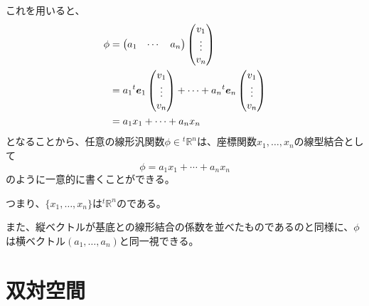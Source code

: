 \documentclass[../../../topic_linear-algebra]{subfiles}
\begin{document}
これを用いると、
\begin{align*}
  \phi & = \begin{pmatrix}
             a_1 & \cdots & a_n
           \end{pmatrix} \begin{pmatrix}
                           v_1    \\
                           \vdots \\
                           v_n
                         \end{pmatrix}                                                \\
       & = a_1 {}^t\vb*{e}_1 \begin{pmatrix}
                               v_1    \\
                               \vdots \\
                               v_n
                             \end{pmatrix} + \cdots + a_n {}^t\vb*{e}_n \begin{pmatrix}
                                                                          v_1    \\
                                                                          \vdots \\
                                                                          v_n
                                                                        \end{pmatrix} \\
       & = a_1 x_1 + \cdots + a_n x_n
\end{align*}
となることから、任意の線形汎関数$\phi \in {}^t\mathbb{R}^n$は、座標関数$x_1,\dots,x_n$の線型結合として
\begin{equation*}
  \phi = a_1 x_1 + \cdots + a_n x_n
\end{equation*}
のように一意的に書くことができる。

つまり、$\{x_1,\dots,x_n\}$は${}^t\mathbb{R}^n$のである。

\br

また、縦ベクトルが基底との線形結合の係数を並べたものであるのと同様に、$\phi$は横ベクトル$(a_1,\dots,a_n)$と同一視できる。

\sectionline
\section{双対空間}
\end{document}
